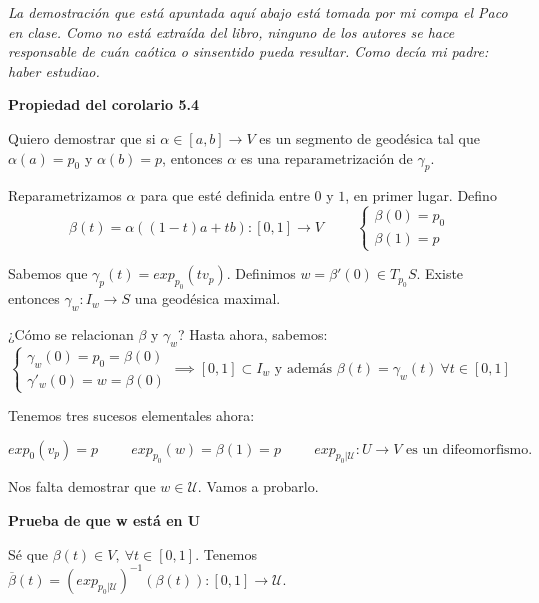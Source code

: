 \documentclass[openany]{book}
\begin{document}
\textit{La demostración que está apuntada aquí abajo está tomada por mi compa el Paco en clase. Como no está extraída del libro, ninguno de los autores se hace responsable de cuán caótica o sinsentido pueda resultar. Como decía mi padre: haber estudiao.}
\begin{center}
\textbf{Propiedad del corolario 5.4}
\end{center}
\begin{demonstration}

  Quiero demostrar que si $ \alpha  \in [a,b] \to  V$ es un segmento de geodésica tal que $\alpha (a) = p_0$ y $\alpha (b) = p$, entonces $\alpha $ es una reparametrización de $\gamma _p$.

  Reparametrizamos $\alpha $ para que esté definida entre $0$ y $1$, en primer lugar. Defino $$\beta (t)=\alpha ((1-t)a+tb):[0,1] \to V \hspace{1cm} \left\{\begin{array}{l}
    \beta (0)=p_0\\
    \beta (1)=p
  \end{array}\right.$$

  Sabemos que $\gamma _p(t) = exp_{p_0}(t v_p)$. Definimos $w= \beta '(0) \in T_{p_0}S$. Existe entonces $\gamma _w : I_w \to S$ una geodésica maximal.

  ¿Cómo se relacionan $ \beta  $ y $ \gamma _w $? Hasta ahora, sabemos:
  $$ \left\{\begin{array}{l}
    \gamma _w(0) = p_0 = \beta (0)\\
    \gamma'_w(0) = w = \beta (0)
  \end{array}\right. \implies [0,1] \subset I_w \text{ y además } \beta (t) = \gamma _w (t)\ \forall t \in [0,1]$$

  Tenemos tres sucesos elementales ahora:

  $$ exp_0(v_p)=p \hspace{1cm} exp_{p_0}(w) = \beta (1) = p \hspace{1cm}exp_{p_0|\mathcal{U}}: U \to V \text{ es un difeomorfismo.} $$

  Nos falta demostrar que $w \in \mathcal{U}$. Vamos a probarlo.

  \begin{center}
  \textbf{Prueba de que w está en U}
  \end{center}

  Sé que $\beta (t) \in V, \ \forall t \in [0,1]$. Tenemos $\overline{\beta }(t) = \left( exp_{p_0 | \mathcal{U}} \right)^{-1} (\beta (t)) : [0,1] \to \mathcal{U}$.


\end{demonstration}
\end{document}
